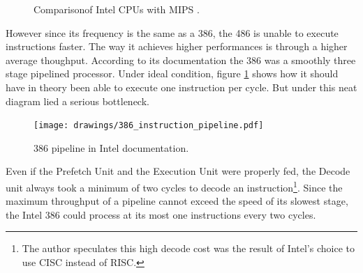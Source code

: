 \par
\begin{figure}[H]
\centering
   \caption{Comparison\protect\footnotemark of Intel CPUs with MIPS \protect\footnotemark.}
 \end{figure}

However since its frequency is the same as a 386, the 486 is unable to execute instructions faster. The way it achieves higher performances is through a higher average thoughput. According to its documentation the 386 was a smoothly three stage pipelined processor. Under ideal condition, figure \ref{386_doc_pipeline} shows how it should have in theory been able to execute one instruction per cycle. But under this neat diagram lied a serious bottleneck.\\
\par
\begin{figure}[H]
\centering
\texttt{[image: drawings/386\_instruction\_pipeline.pdf]}
\caption{386 pipeline in Intel documentation.}
\label{386_doc_pipeline}
\end{figure}



\par
Even if the Prefetch Unit and the Execution Unit were properly fed, the Decode unit always took a minimum of two cycles to decode an instruction\footnote{The author speculates this high decode cost was the result of Intel's choice to use CISC instead of RISC.}. Since the maximum throughput of a pipeline cannot exceed the speed of its slowest stage, the Intel 386 could process at its most one instructions every two cycles.\\
\par

